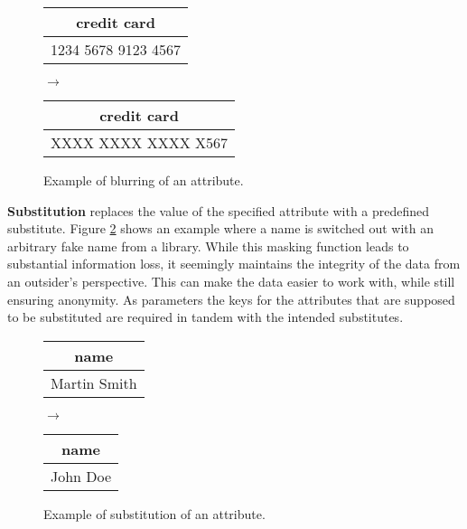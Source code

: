 \begin{figure}[ht]
    \begin{center}
    \footnotesize{
        \renewcommand{\arraystretch}{1.5}
        \begin{tabular}{|c|}
            \hline
            credit card \\
            \hline
            1234 5678 9123 4567 \\
            \hline
            \end{tabular}
            \quad $\longrightarrow$ \quad
            \begin{tabular}{|c|}
            \hline
            credit card \\
            \hline
            XXXX XXXX XXXX X567 \\
            \hline
        \end{tabular}
    }
    \end{center}
    \caption{Example of blurring of an attribute.\label{fig:blurring}}
\end{figure}

\textbf{Substitution} replaces the value of the specified attribute with a predefined substitute. Figure \ref{fig:substitution} shows an example where a name is switched out with an arbitrary fake name from a library. While this masking function leads to substantial information loss, it seemingly maintains the integrity of the data from an outsider's perspective. This can make the data easier to work with, while still ensuring anonymity. As parameters the keys for the attributes that are supposed to be substituted are required in tandem with the intended substitutes. 

\bigskip

\begin{figure}[ht]
    \begin{center}
    \footnotesize{
        \renewcommand{\arraystretch}{1.5}
        \begin{tabular}{|c|}
            \hline
            name \\
            \hline
            Martin Smith \\
            \hline
            \end{tabular}
            \quad $\longrightarrow$ \quad
            \begin{tabular}{|c|}
            \hline
            name \\
            \hline
            John Doe \\
            \hline
        \end{tabular}
    }
    \end{center}
    \caption{Example of substitution of an attribute.\label{fig:substitution}}
\end{figure}


